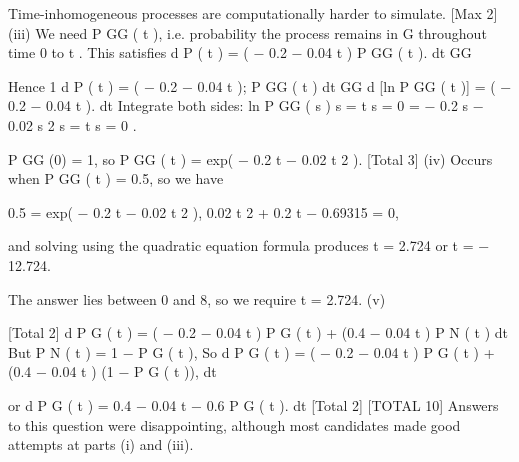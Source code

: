 \documentclass[a4paper,12pt]{article}
\begin{document}
Time-inhomogeneous processes are computationally harder to simulate. 
[Max 2]
(iii)
We need P GG ( t ), i.e. probability the process remains in G throughout time 0 to
t .
This satisfies
d
P ( t ) = ( − 0.2 − 0.04 t ) P GG ( t ).
dt GG

Hence
1
d
P ( t ) = ( − 0.2 − 0.04 t );
P GG ( t ) dt GG
d
[ln P GG ( t )] = ( − 0.2 − 0.04 t ).
dt
Integrate both sides:
ln P GG ( s )
s = t
s = 0
= − 0.2 s − 0.02 s 2
s = t
s = 0
.

P GG (0) = 1, 
so P GG ( t ) = exp( − 0.2 t − 0.02 t 2 ). 
[Total 3]
(iv)
Occurs when P GG ( t ) = 0.5, so we have

0.5 = exp( − 0.2 t − 0.02 t 2 ),
0.02 t 2 + 0.2 t − 0.69315 = 0,

and solving using the quadratic equation formula produces
t = 2.724 or t = − 12.724.

The answer lies between 0 and 8, so we require t = 2.724.
(v)

[Total 2]
d
P G ( t ) = ( − 0.2 − 0.04 t ) P G ( t ) + (0.4 − 0.04 t ) P N ( t )
dt 
But P N ( t ) = 1 − P G ( t ), 
So
d
P G ( t ) = ( − 0.2 − 0.04 t ) P G ( t ) + (0.4 − 0.04 t ) (1 − P G ( t )),
dt

or
d
P G ( t ) = 0.4 − 0.04 t − 0.6 P G ( t ).
dt
[Total 2]
[TOTAL 10]
Answers to this question were disappointing, although most candidates made
good attempts at parts (i) and (iii).
\end{document}
